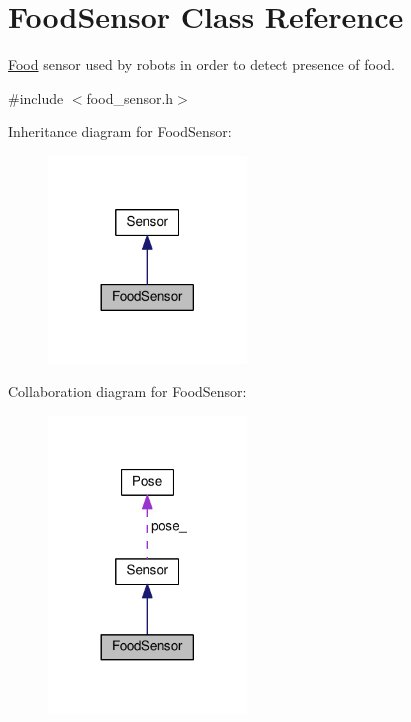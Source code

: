 \hypertarget{classFoodSensor}{}\section{Food\+Sensor Class Reference}
\label{classFoodSensor}


\hyperlink{classFood}{Food} sensor used by robots in order to detect presence of food.  




{\ttfamily \#include $<$food\+\_\+sensor.\+h$>$}



Inheritance diagram for Food\+Sensor\+:\nopagebreak
\begin{figure}[H]
\begin{center}
\leavevmode
\includegraphics[width=149pt]{classFoodSensor__inherit__graph}
\end{center}
\end{figure}


Collaboration diagram for Food\+Sensor\+:\nopagebreak
\begin{figure}[H]
\begin{center}
\leavevmode
\includegraphics[width=149pt]{classFoodSensor__coll__graph}
\end{center}
\end{figure}
